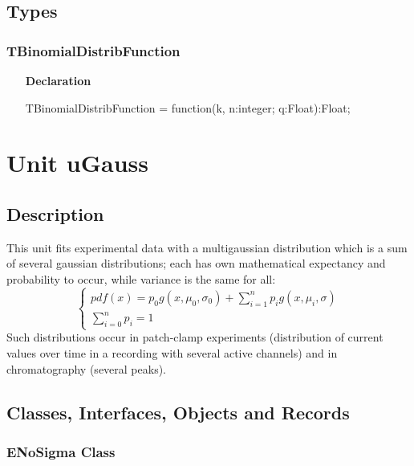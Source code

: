 \documentclass[12pt,a4paper,oneside]{report}
\newcommand{\lmath}[1]{   %
	\marginpar{\vspace{#1} 
		\begin{flushright}
			LMath
	\end{flushright} }
}
\newcommand{\declarationitem}[1]{\textbf{#1}}
\begin{document}
\subsection{Types}
\subsubsection{TBinomialDistribFunction}
\label{udistribs-TBinomialDistribFunction}
\begin{itemize}\item[\declarationitem{Declaration}\hfill]
	\begin{flushleft}
		\begin{ttfamily}
			TBinomialDistribFunction = function(k, n:integer; q:Float):Float;\end{ttfamily}
	\end{flushleft}
\end{itemize}

\section{Unit uGauss}\lmath{-24pt}
\label{ugauss}
\subsection{Description}
This unit fits experimental data with a multigaussian distribution which is a sum of several gaussian distributions; each has own mathematical expectancy and probability to occur, while variance is the same for all:
\begin{equation}
\label{eq:sum_gaussians}
\begin{cases}
pdf(x)=p_0g(x,\mu_0,\sigma_0)+\sum\limits_{i=1}^{n}p_{i}g(x,\mu_i,\sigma) \\
\sum\limits_{i=0}^{n}p_i=1 \,
\end{cases}
\end{equation}
Such distributions occur in patch{-}clamp experiments (distribution of current values over time in a recording with several active channels) and in chromatography (several peaks).
\subsection{Classes, Interfaces, Objects and Records}
\subsubsection{ENoSigma Class}
\label{ugauss.ENoSigma}
\end{document}
